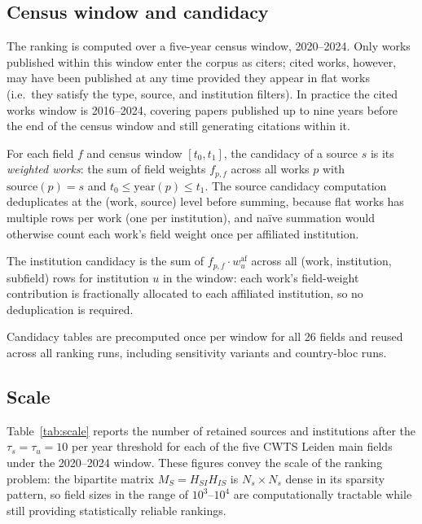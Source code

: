 \subsection{Census window and candidacy}

The ranking is computed over a five-year census window, 2020--2024.  Only
works published within this window enter the corpus as citers; cited works,
however, may have been published at any time provided they appear in flat works
(i.e.\ they satisfy the type, source, and institution filters).  In practice
the cited works window is 2016--2024, covering papers published up to nine
years before the end of the census window and still generating citations within
it.

For each field $f$ and census window $[t_0, t_1]$, the candidacy of a source
$s$ is its \emph{weighted works}: the sum of field weights $f_{p,f}$ across
all works $p$ with $\mathrm{source}(p) = s$ and $t_0 \leq
\mathrm{year}(p) \leq t_1$.  The source candidacy computation deduplicates
at the (work, source) level before summing, because flat works has multiple
rows per work (one per institution), and naïve summation would otherwise count
each work's field weight once per affiliated institution.

The institution candidacy is the sum of $f_{p,f} \cdot w_u^{\mathrm{af}}$
across all (work, institution, subfield) rows for institution $u$ in the
window: each work's field-weight contribution is fractionally allocated to each
affiliated institution, so no deduplication is required.

Candidacy tables are precomputed once per window for all 26 fields and reused
across all ranking runs, including sensitivity variants and country-bloc runs.

\subsection{Scale}

Table~\ref{tab:scale} reports the number of retained sources and institutions
after the $\tau_s = \tau_u = 10$ per year threshold for each of the five CWTS
Leiden main fields under the 2020--2024 window.  These figures convey the
scale of the ranking problem: the bipartite matrix $M_S = H_{SI}H_{IS}$ is
$N_s \times N_s$ dense in its sparsity pattern, so field sizes in the range of
$10^3$--$10^4$ are computationally tractable while still providing
statistically reliable rankings.

